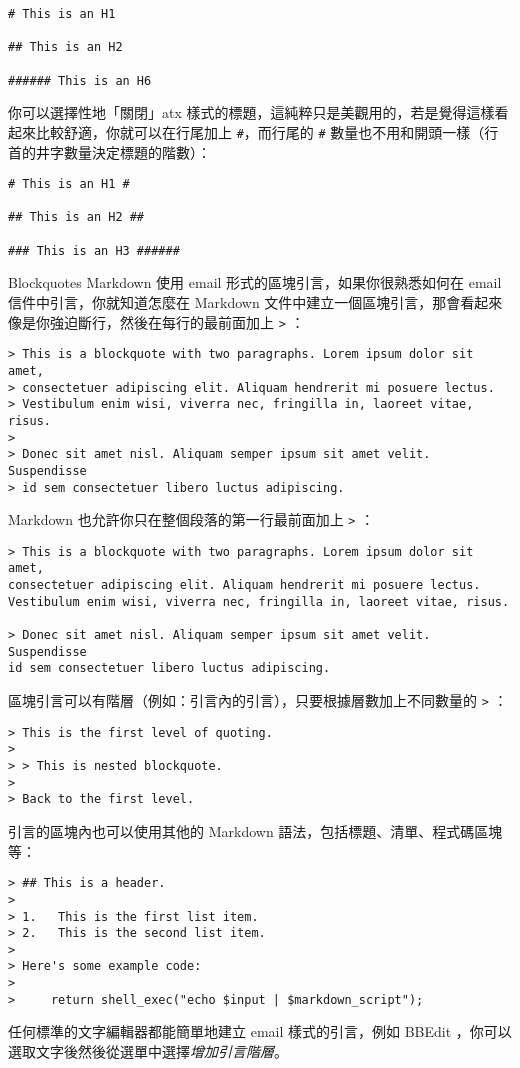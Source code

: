 \begin{verbatim}
# This is an H1

## This is an H2

###### This is an H6
\end{verbatim}
你可以選擇性地「關閉」atx
樣式的標題，這純粹只是美觀用的，若是覺得這樣看起來比較舒適，你就可以在行尾加上
\texttt{\#}，而行尾的 \texttt{\#}
數量也不用和開頭一樣（行首的井字數量決定標題的階數）：

\begin{verbatim}
# This is an H1 #

## This is an H2 ##

### This is an H3 ######
\end{verbatim}
Blockquotes
Markdown 使用 email 形式的區塊引言，如果你很熟悉如何在 email
信件中引言，你就知道怎麼在 Markdown
文件中建立一個區塊引言，那會看起來像是你強迫斷行，然後在每行的最前面加上
\texttt{\textgreater{}} ：

\begin{verbatim}
> This is a blockquote with two paragraphs. Lorem ipsum dolor sit amet,
> consectetuer adipiscing elit. Aliquam hendrerit mi posuere lectus.
> Vestibulum enim wisi, viverra nec, fringilla in, laoreet vitae, risus.
> 
> Donec sit amet nisl. Aliquam semper ipsum sit amet velit. Suspendisse
> id sem consectetuer libero luctus adipiscing.
\end{verbatim}
Markdown 也允許你只在整個段落的第一行最前面加上 \texttt{\textgreater{}}
：

\begin{verbatim}
> This is a blockquote with two paragraphs. Lorem ipsum dolor sit amet,
consectetuer adipiscing elit. Aliquam hendrerit mi posuere lectus.
Vestibulum enim wisi, viverra nec, fringilla in, laoreet vitae, risus.

> Donec sit amet nisl. Aliquam semper ipsum sit amet velit. Suspendisse
id sem consectetuer libero luctus adipiscing.
\end{verbatim}
區塊引言可以有階層（例如：引言內的引言），只要根據層數加上不同數量的
\texttt{\textgreater{}} ：

\begin{verbatim}
> This is the first level of quoting.
>
> > This is nested blockquote.
>
> Back to the first level.
\end{verbatim}
引言的區塊內也可以使用其他的 Markdown 語法，包括標題、清單、程式碼區塊等：

\begin{verbatim}
> ## This is a header.
> 
> 1.   This is the first list item.
> 2.   This is the second list item.
> 
> Here's some example code:
> 
>     return shell_exec("echo $input | $markdown_script");
\end{verbatim}
任何標準的文字編輯器都能簡單地建立 email 樣式的引言，例如 BBEdit
，你可以選取文字後然後從選單中選擇\emph{增加引言階層}。

